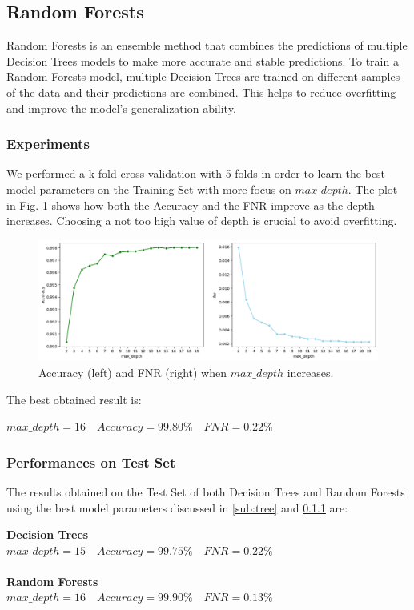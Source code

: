 \documentclass[twocolumn, switch]{article} %
\newcommand\x{0.7}
\begin{document}
\subsection{Random Forests}
Random Forests is an ensemble method that combines the predictions of multiple Decision Trees models to make more accurate and stable predictions.
To train a Random Forests model, multiple Decision Trees are trained on different samples of the data and their predictions are combined. This helps to reduce overfitting and improve the model's generalization ability.

\subsubsection{Experiments}
\label{sub:randomforest}
We performed a k-fold cross-validation with 5 folds in order to learn the best model parameters on the Training Set with more focus on $max\_depth$. The plot in Fig. \ref{fig:foresttrain} shows how both the Accuracy and the FNR improve as the depth increases. Choosing a not too high value of depth is crucial to avoid overfitting.

\begin{figure}[ht!]
	\centering
	\includegraphics[width=\x\linewidth]{randomforest_accuracy_fnr.png}
	\caption{Accuracy (left) and FNR (right) when $max\_depth$ increases.}
	\label{fig:foresttrain}
\end{figure}
The best obtained result is:
\begin{center}
	$max\_depth=16 \quad Accuracy=99.80\% \quad FNR=0.22\%$
\end{center}

\subsubsection{Performances on Test Set}
The results obtained on the Test Set of both Decision Trees and Random Forests using the best model parameters discussed in \ref{sub:tree} and \ref{sub:randomforest} are:
\begin{center}
	\textbf{Decision Trees}\\
	$max\_depth=15 \quad Accuracy=99.75\% \quad FNR=0.22\%$\\~\\
	\textbf{Random Forests}\\
	$max\_depth=16 \quad Accuracy=99.90\% \quad FNR=0.13\%$
\end{center}
\end{document}

